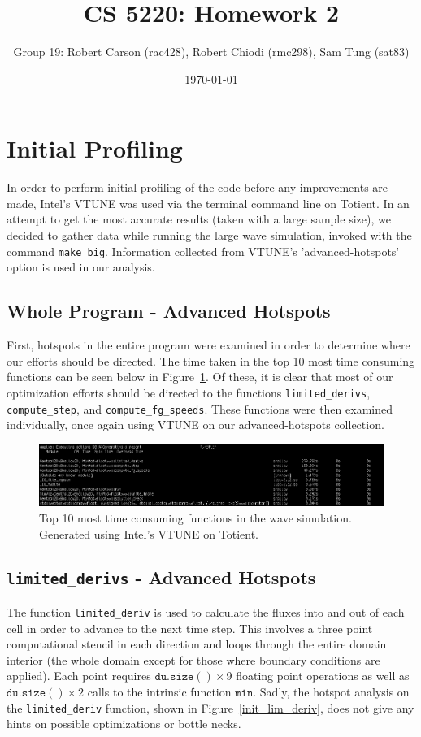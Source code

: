\documentclass[12pt]{article}
\begin{document}
	
	\title{CS 5220: Homework 2}
	\date{\today}
	\author{Group 19: Robert Carson (rac428), Robert Chiodi (rmc298), Sam Tung (sat83)}
	\maketitle
		
	\section{Initial Profiling}
	In order to perform initial profiling of the code before any improvements are made, Intel's VTUNE was used via the terminal command line on Totient. In an attempt to get the most accurate results (taken with a large sample size), we decided to gather data while running the large wave simulation, invoked with the command \texttt{make big}. Information collected from VTUNE's 'advanced-hotspots' option is used in our analysis.
		\subsection{Whole Program - Advanced Hotspots}
		First, hotspots in the entire program were examined in order to determine where our efforts should be directed. The time taken in the top 10 most time consuming functions can be seen below in Figure~\ref{top10}. Of these, it is clear that most of our optimization efforts should be directed to the functions \texttt{limited\_derivs}, \texttt{compute\_step}, and \texttt{compute\_fg\_speeds}. These functions were then examined individually, once again using VTUNE on our advanced-hotspots collection.
		\begin{figure}[h]
			\begin{center}
				\includegraphics[width=0.7\columnwidth]{top10}
				\caption{Top 10 most time consuming functions in the wave simulation. Generated using Intel's VTUNE on Totient.}
				\label{top10}
			\end{center}
		\end{figure}
		\subsection{\texttt{limited\_derivs} - Advanced Hotspots}
		The function \texttt{limited\_deriv} is used to calculate the fluxes into and out of each cell in order to advance to the next time step. This involves a three point computational stencil in each direction and loops through the entire domain interior (the whole domain except for those where boundary conditions are applied). Each point requires $\mathtt{du.size()}\times 9$ floating point operations as well as $\mathtt{du.size()} \times 2$ calls to the intrinsic function $\mathtt{min}$. Sadly, the hotspot analysis on the \texttt{limited\_deriv} function, shown in Figure~\ref{init_lim_deriv}, does not give any hints on possible optimizations or bottle necks.
		
\end{document}
